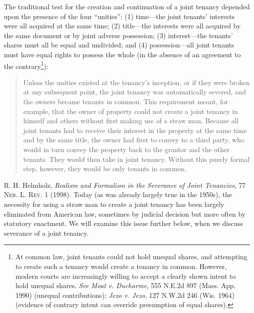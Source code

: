 The traditional test for the creation and continuation of a joint tenancy
depended upon the presence of the four ``unities'': (1) time---the joint
tenants' interests were all acquired at the same time; (2) title---the interests
were all acquired by the same document or by joint adverse possession; (3)
interest---the tenants' shares must all be equal and undivided; and (4)
possession---all joint tenants must have equal rights to possess the whole (in
the absence of an agreement to the contrary\footnote{At common law, joint
tenants could not hold unequal shares, and attempting to create such a tenancy
would create a tenancy in common. However, modern courts are increasingly
willing to accept a clearly shown intent to hold unequal shares. \emph{See}
\emph{Moat v. Ducharme}, 555 N.E.2d 897 (Mass. App. 1990) (unequal
contributions); \emph{Jezo v. Jezo}, 127 N.W.2d 246 (Wis. 1964) (evidence of
contrary intent can override presumption of equal shares).}):
\begin{quote}
Unless the unities existed at the tenancy's inception, or if they were broken at
any subsequent point, the joint tenancy was automatically severed, and the
owners became tenants in common. This requirement meant, for example, that the
owner of property could not create a joint tenancy in himself and others
without first making use of a straw man. Because all joint tenants had to
receive their interest in the property at the same time and by the same title,
the owner had first to convey to a third party, who would in turn convey the
property back to the grantor and the other tenants. They would then take in
joint tenancy. Without this purely formal step, however, they would be only
tenants in common.
\end{quote}
R. H. Helmholz, \textit{Realism and Formalism in the Severance of Joint
Tenancies}, 77 \textsc{Neb. L. Rev.} 1 (1998). Today (as was already largely
true in the 1950s), the necessity for using a straw man to create a joint
tenancy has been largely eliminated from American law, sometimes by judicial
decision but more often by statutory enactment. We will examine this issue
further below, when we discuss severance of a joint tenancy.

